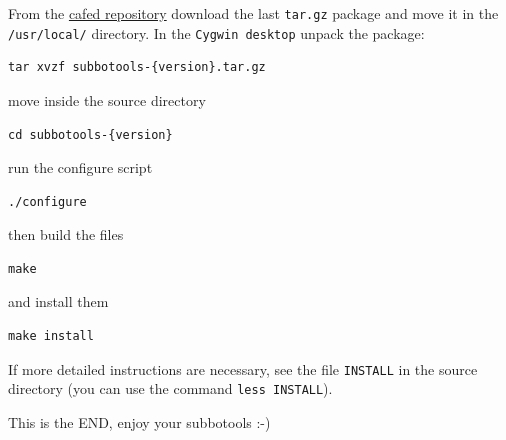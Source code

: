 \documentclass[11pt]{article}
\begin{document}
From the \href{ftp://cafed.sssup.it/packages/}{cafed repository} download the last \texttt{tar.gz} package and move
it in the \texttt{/usr/local/} directory. In the \texttt{Cygwin desktop} unpack the
package:
\begin{verbatim}
tar xvzf subbotools-{version}.tar.gz
\end{verbatim}
move inside the source directory
\begin{verbatim}
cd subbotools-{version}
\end{verbatim}
run the configure script
\begin{verbatim}
./configure
\end{verbatim}
then build the files
\begin{verbatim}
make
\end{verbatim}
and install them
\begin{verbatim}
make install
\end{verbatim}

If more detailed instructions are necessary, see the file \texttt{INSTALL} in
the source directory (you can use the command \verb~less INSTALL~).

This is the END, enjoy your subbotools :-)
\end{document}

